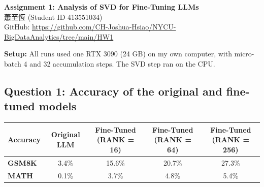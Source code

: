 \documentclass[10pt,a4paper]{article}
\newcommand{\cjkname}[1]{#1}
\newcommand{\cjkname}[1]{\begin{CJK}{UTF8}{bkai}#1\end{CJK}}
\begin{document}
\begin{center}
  {\large\bfseries Assignment 1: Analysis of SVD for Fine-Tuning LLMs}\\[4pt]
  \cjkname{蕭至恆} (Student ID 413551034) \\
  GitHub: \url{https://github.com/CH-Joshua-Hsiao/NYCU-BigDataAnalytics/tree/main/HW1}
\end{center}
\textbf{Setup:} All runs used one RTX 3090 (24 GB) on my own computer, with micro-batch 4 and 32 accumulation steps. The SVD step
ran on the CPU.

\subsection*{Question 1: Accuracy of the original and fine-tuned models}
\begin{center}\small
\begin{tabularx}{\textwidth}{|l|C|C|C|C|}
  \hline
  \textbf{Accuracy} & \textbf{Original LLM} & \textbf{Fine-Tuned (RANK = 16)} & \textbf{Fine-Tuned (RANK = 64)} & \textbf{Fine-Tuned (RANK = 256)} \\
  \hline
  \textbf{GSM8K} & 3.4\% & 15.6\% & 20.7\% & 27.3\% \\ \hline
  \textbf{MATH}  & 0.1\% & 3.7\%  & 4.8\%  & 5.4\%  \\
  \hline
\end{tabularx}
\end{center}
\end{document}
